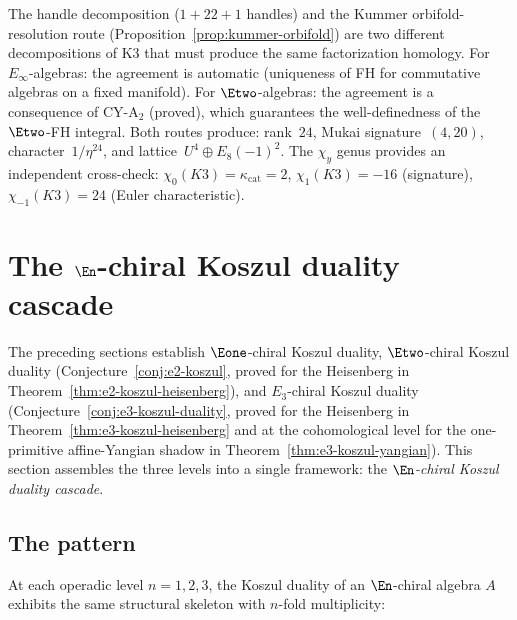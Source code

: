\begin{remark}
\label{rem:handle-vs-kummer}
The handle decomposition ($1 + 22 + 1$ handles) and the Kummer orbifold-resolution route (Proposition~\ref{prop:kummer-orbifold}) are two different decompositions of K3 that must produce the same factorization homology. For $E_\infty$-algebras: the agreement is automatic (uniqueness of FH for commutative algebras on a fixed manifold). For $\Etwo$-algebras: the agreement is a consequence of CY-A$_2$ (proved), which guarantees the well-definedness of the $\Etwo$-FH integral. Both routes produce: rank~$24$, Mukai signature~$(4, 20)$, character~$1/\eta^{24}$, and lattice~$U^4 \oplus E_8(-1)^2$. The $\chi_y$ genus provides an independent cross-check: $\chi_0(K3) = \kappa_{\mathrm{cat}} = 2$, $\chi_1(K3) = -16$ (signature), $\chi_{-1}(K3) = 24$ (Euler characteristic).
\end{remark}

\section{The \texorpdfstring{$\En$}{E-n}-chiral Koszul duality cascade}
\label{sec:en-koszul-cascade}

The preceding sections establish $\Eone$-chiral Koszul duality, $\Etwo$-chiral Koszul duality (Conjecture~\ref{conj:e2-koszul}, proved for the Heisenberg in Theorem~\ref{thm:e2-koszul-heisenberg}), and $E_3$-chiral Koszul duality (Conjecture~\ref{conj:e3-koszul-duality}, proved for the Heisenberg in Theorem~\ref{thm:e3-koszul-heisenberg} and at the cohomological level for the one-primitive affine-Yangian shadow in Theorem~\ref{thm:e3-koszul-yangian}). This section assembles the three levels into a single framework: the \emph{$\En$-chiral Koszul duality cascade}.

\subsection{The pattern}
\label{subsec:cascade-pattern}

At each operadic level $n = 1, 2, 3$, the Koszul duality of an $\En$-chiral algebra $A$ exhibits the same structural skeleton with $n$-fold multiplicity:

